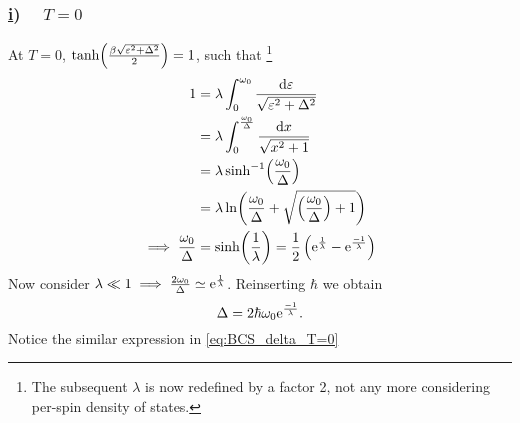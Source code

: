 \subsubsection*{\underline{i}) $\quad T = 0$}

At $T = 0$, $\tanh(\frac{\beta\sqrt{\varepsilon^2+\Delta^2}}{2}) = 1$, such that \footnote{The subsequent $\lambda$ is now redefined by a factor 2, not any more considering per-spin density of states.}	
\begin{align}
	1 &= \lambda\int_{0}^{\omega_0}\dfrac{\dd{\varepsilon}}{\sqrt{\varepsilon^2 + \Delta^2}} \\
	&= \lambda\int_0^{\frac{\omega_0}{\Delta}}\dfrac{\dd{x}}{\sqrt{x^2+1}} \\
	&= \lambda\sinh[-1](\dfrac{\omega_0}{\Delta}) \\
	&=\lambda\ln(\dfrac{\omega_0}{\Delta} + \sqrt{\left (\dfrac{\omega_0}{\Delta}\right )+1 }) \\
	\implies \dfrac{\omega_0}{\Delta} &= \sinh(\dfrac{1}{\lambda}) = \dfrac{1}{2}\left(\mathrm{e}^{\frac{1}{\lambda}}-\mathrm{e}^{\frac{-1}{\lambda}}\right)
\end{align}
Now consider $\lambda \ll 1 \implies \frac{2\omega_0}{\Delta}\simeq\mathrm{e}^{\frac{1}{\lambda}}$. Reinserting $\hbar$ we obtain 
\begin{equation}
\label{eq:BCS_delta_T=0}
\Delta = 2\hbar\omega_0\mathrm{e}^{\frac{-1}{\lambda}}.
\end{equation}
Notice the similar expression in \cref{eq:BCS_delta_T=0} 
